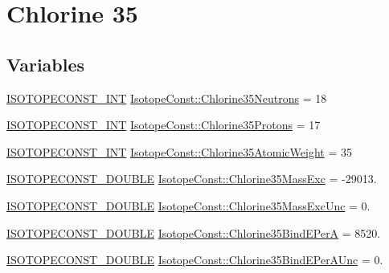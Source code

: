 \hypertarget{group___isotope_const-_chlorine-_cl35}{}\section{Chlorine 35}
\label{group___isotope_const-_chlorine-_cl35}
\subsection*{Variables}
\begin{DoxyCompactItemize}
\item 
\mbox{\hyperlink{group___isotope_const-_macros_ga5f18360b3e99483a35c32d789e62621c}{I\+S\+O\+T\+O\+P\+E\+C\+O\+N\+S\+T\+\_\+\+I\+NT}} \mbox{\hyperlink{group___isotope_const-_chlorine-_cl35_gacc4ba22547d5bd2c27dbb317c8ee1c53}{Isotope\+Const\+::\+Chlorine35\+Neutrons}} = 18
\item 
\mbox{\hyperlink{group___isotope_const-_macros_ga5f18360b3e99483a35c32d789e62621c}{I\+S\+O\+T\+O\+P\+E\+C\+O\+N\+S\+T\+\_\+\+I\+NT}} \mbox{\hyperlink{group___isotope_const-_chlorine-_cl35_ga92b51e18b8001c873103694470a33d4a}{Isotope\+Const\+::\+Chlorine35\+Protons}} = 17
\item 
\mbox{\hyperlink{group___isotope_const-_macros_ga5f18360b3e99483a35c32d789e62621c}{I\+S\+O\+T\+O\+P\+E\+C\+O\+N\+S\+T\+\_\+\+I\+NT}} \mbox{\hyperlink{group___isotope_const-_chlorine-_cl35_ga99ab27db5f81f808dc7ca97e9651e31d}{Isotope\+Const\+::\+Chlorine35\+Atomic\+Weight}} = 35
\item 
\mbox{\hyperlink{group___isotope_const-_macros_ga8f45a7272ce02c0b4c65c44636ed719a}{I\+S\+O\+T\+O\+P\+E\+C\+O\+N\+S\+T\+\_\+\+D\+O\+U\+B\+LE}} \mbox{\hyperlink{group___isotope_const-_chlorine-_cl35_gaf7dba8f5fb87a63221a24ac5cb380e32}{Isotope\+Const\+::\+Chlorine35\+Mass\+Exc}} = -\/29013.
\item 
\mbox{\hyperlink{group___isotope_const-_macros_ga8f45a7272ce02c0b4c65c44636ed719a}{I\+S\+O\+T\+O\+P\+E\+C\+O\+N\+S\+T\+\_\+\+D\+O\+U\+B\+LE}} \mbox{\hyperlink{group___isotope_const-_chlorine-_cl35_ga60992e5b94184684487ed04376a723c5}{Isotope\+Const\+::\+Chlorine35\+Mass\+Exc\+Unc}} = 0.
\item 
\mbox{\hyperlink{group___isotope_const-_macros_ga8f45a7272ce02c0b4c65c44636ed719a}{I\+S\+O\+T\+O\+P\+E\+C\+O\+N\+S\+T\+\_\+\+D\+O\+U\+B\+LE}} \mbox{\hyperlink{group___isotope_const-_chlorine-_cl35_ga566a487b529ee0210f303a90db49320a}{Isotope\+Const\+::\+Chlorine35\+Bind\+E\+PerA}} = 8520.
\item 
\mbox{\hyperlink{group___isotope_const-_macros_ga8f45a7272ce02c0b4c65c44636ed719a}{I\+S\+O\+T\+O\+P\+E\+C\+O\+N\+S\+T\+\_\+\+D\+O\+U\+B\+LE}} \mbox{\hyperlink{group___isotope_const-_chlorine-_cl35_ga9928c6ddb52c4f19bf2f0f729adaa6e0}{Isotope\+Const\+::\+Chlorine35\+Bind\+E\+Per\+A\+Unc}} = 0.

\end{DoxyCompactItemize}
